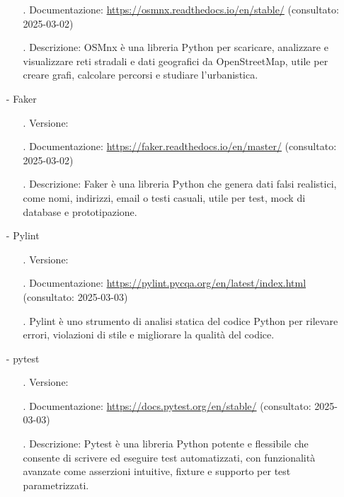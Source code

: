 \documentclass[10pt]{article}
\begin{document}
\begin{justify}
\begin{itemize}
\begin{itemize}
                            \item[.] Documentazione: \url{https://osmnx.readthedocs.io/en/stable/} (consultato: 2025-03-02)
                            \item[.] Descrizione: OSMnx è una libreria Python per scaricare, analizzare e visualizzare reti stradali e dati geografici da OpenStreetMap, 
                            utile per creare grafi, calcolare percorsi e studiare l’urbanistica.
                        \end{itemize}
                    \item[-] Faker
                        \begin{itemize}
                            \item[.] Versione:
                            \item[.] Documentazione: \url{https://faker.readthedocs.io/en/master/} (consultato: 2025-03-02)
                            \item[.] Descrizione: Faker è una libreria Python che genera dati falsi realistici, come nomi, indirizzi, email o testi casuali, utile per test, 
                            mock di database e prototipazione.
                        \end{itemize}
                    \item[-] Pylint
                        \begin{itemize}
                            \item[.] Versione:
                            \item[.] Documentazione: \url{https://pylint.pycqa.org/en/latest/index.html} (consultato: 2025-03-03)
                            \item[.] Pylint è uno strumento di analisi statica del codice Python per rilevare errori, violazioni di stile e migliorare la qualità del codice.
                        \end{itemize}
                    \item[-] pytest
                        \begin{itemize}
                            \item[.] Versione:
                            \item[.] Documentazione: \url{https://docs.pytest.org/en/stable/} (consultato: 2025-03-03)
                            \item[.] Descrizione: Pytest è una libreria Python potente e flessibile che consente di scrivere ed eseguire test automatizzati, con funzionalità avanzate come 
                            asserzioni intuitive, fixture e supporto per test parametrizzati.
                        \end{itemize}
                \end{itemize}



\end{justify}
\end{document}
